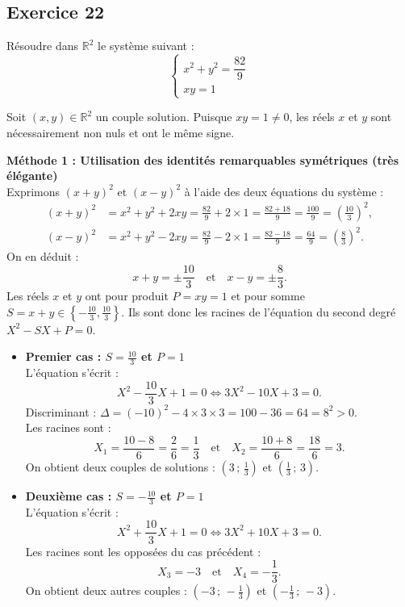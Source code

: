 \documentclass[11pt,a4paper]{article}
\begin{document}
\subsection*{Exercice 22}
Résoudre dans $\mathbb{R}^2$ le système suivant :
\[
\begin{cases}
x^2 + y^2 = \dfrac{82}{9} \\[2mm]
xy = 1
\end{cases}
\]

\begin{correctionbox}
Soit $(x, y) \in \mathbb{R}^2$ un couple solution. Puisque $xy = 1 \ne 0$, les réels $x$ et $y$ sont nécessairement non nuls et ont le même signe.

\textbf{Méthode 1 : Utilisation des identités remarquables symétriques (très élégante)}\\
Exprimons $(x+y)^2$ et $(x-y)^2$ à l'aide des deux équations du système :
\[
\begin{aligned}
(x+y)^2 &= x^2 + y^2 + 2xy = \frac{82}{9} + 2 \times 1 = \frac{82 + 18}{9} = \frac{100}{9} = \left(\frac{10}{3}\right)^2, \\[2mm]
(x-y)^2 &= x^2 + y^2 - 2xy = \frac{82}{9} - 2 \times 1 = \frac{82 - 18}{9} = \frac{64}{9} = \left(\frac{8}{3}\right)^2.
\end{aligned}
\]
On en déduit :
\[
x+y = \pm \frac{10}{3} \quad \text{et} \quad x-y = \pm \frac{8}{3}.
\]
Les réels $x$ et $y$ ont pour produit $P = xy = 1$ et pour somme $S = x+y \in \left\{ -\frac{10}{3}, \frac{10}{3} \right\}$.
Ils sont donc les racines de l'équation du second degré $X^2 - SX + P = 0$.

\begin{itemize}[leftmargin=*,label=\textbullet]
    \item \textbf{Premier cas : $S = \frac{10}{3}$ et $P = 1$}\\
    L'équation s'écrit :
    \[
    X^2 - \frac{10}{3}X + 1 = 0 \iff 3X^2 - 10X + 3 = 0.
    \]
    Discriminant : $\Delta = (-10)^2 - 4 \times 3 \times 3 = 100 - 36 = 64 = 8^2 > 0$.\\
    Les racines sont :
    \[
    X_1 = \frac{10 - 8}{6} = \frac{2}{6} = \frac{1}{3} \quad \text{et} \quad X_2 = \frac{10 + 8}{6} = \frac{18}{6} = 3.
    \]
    On obtient deux couples de solutions : $\left(3\,;\,\frac{1}{3}\right)$ et $\left(\frac{1}{3}\,;\,3\right)$.

    \item \textbf{Deuxième cas : $S = -\frac{10}{3}$ et $P = 1$}\\
    L'équation s'écrit :
    \[
    X^2 + \frac{10}{3}X + 1 = 0 \iff 3X^2 + 10X + 3 = 0.
    \]
    Les racines sont les opposées du cas précédent :
    \[
    X_3 = -3 \quad \text{et} \quad X_4 = -\frac{1}{3}.
    \]
    On obtient deux autres couples : $\left(-3\,;\,-\frac{1}{3}\right)$ et $\left(-\frac{1}{3}\,;\,-3\right)$.
\end{itemize}


\end{correctionbox}
\end{document}
